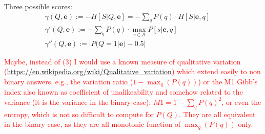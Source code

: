 \documentclass[runningheads]{llncs}
\begin{document}
	Three possible scores:
	\begin{eqnarray}
		\gamma(Q,\bm{e}) := -H[S|Q,\bm{e}] = -\sum_q P(q) \cdot H[S|\bm{e},q]&&\\
		\gamma'(Q,\bm{e}) :=  -\sum_q P(q) \cdot \max_{s\in\mathcal{S}}  P[s|\bm{e},q]&&\\
		\gamma''(Q,\bm{e}) :=  |P(Q=1|\bm{e})-0.5|&&
	\end{eqnarray}
	
	\textcolor{red}{Maybe, instead of (3) I would use a known measure of qualitative 
	variation (\url{https://en.wikipedia.org/wiki/Qualitative_variation}) which extend easily to 
	non binary answers, e.g., the variation ratio ($1-\max_q(P(q))$) or the M1 Gibb's index 
	also known as coefficient of unalikeability and somehow related to the variance (it is 
	the variance in the binary case): $M1 = 1-\sum_q P(q)^2$, or even the entropy, which is 
	not so difficult to compute for $P(Q)$. They are all equivalent in the binary case, as 
	they are all monotonic function of $\max_q(P(q))$ only. }
	
\end{document}
